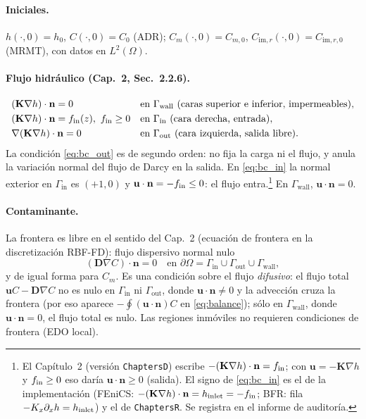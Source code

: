 \documentclass[11pt]{article}
\numberwithin{equation}{section}
\theoremstyle{remark}
\newcommand{\bu}{\mathbf{u}}
\newcommand{\bK}{\mathbf{K}}
\newcommand{\bD}{\mathbf{D}}
\newcommand{\bn}{\mathbf{n}}
\newcommand{\im}{\mathrm{im}}
\newcommand{\Gin}{\Gamma_{\mathrm{in}}}
\newcommand{\Gout}{\Gamma_{\mathrm{out}}}
\newcommand{\Gwall}{\Gamma_{\mathrm{wall}}}
\begin{document}
\paragraph{Iniciales.} $h(\cdot,0)=h_0$, $C(\cdot,0)=C_0$ (ADR); $C_m(\cdot,0)=C_{m,0}$, $C_{\im,r}(\cdot,0)=C_{\im,r,0}$ (MRMT), con datos en $L^2(\Omega)$.

\paragraph{Flujo hidr\'aulico (Cap.~2, Sec.~2.2.6).}
\begin{align}
&(\bK\nabla h)\cdot\bn=0 &&\text{en }\Gwall\ (\text{caras superior e inferior, impermeables}),\label{eq:bc_wall}\\
&(\bK\nabla h)\cdot\bn=f_{\rm in}(z),\ f_{\rm in}\ge0 &&\text{en }\Gin\ (\text{cara derecha, entrada}),\label{eq:bc_in}\\
&\nabla(\bK\nabla h)\cdot\bn=0 &&\text{en }\Gout\ (\text{cara izquierda, salida libre}).\label{eq:bc_out}
\end{align}
La condici\'on \eqref{eq:bc_out} es de segundo orden: no fija la carga ni el flujo, y anula la variaci\'on normal del flujo de Darcy en la salida.
En \eqref{eq:bc_in} la normal exterior en $\Gin$ es $(+1,0)$ y $\bu\cdot\bn=-f_{\rm in}\le0$: el flujo entra.\footnote{El
Cap\'itulo~2 (versi\'on \texttt{ChaptersD}) escribe $-(\bK\nabla h)\cdot\bn=f_{\rm in}$; con $\bu=-\bK\nabla h$ y $f_{\rm in}\ge0$ eso dar\'ia
$\bu\cdot\bn\ge0$ (salida). El signo de \eqref{eq:bc_in} es el de la implementaci\'on (FEniCS: $-(\bK\nabla h)\cdot\bn=h_{\rm inlet}=-f_{\rm in}$;
BFR: fila $-K_x\partial_xh=h_{\rm inlet}$) y el de \texttt{ChaptersR}. Se registra en el informe de auditor\'ia.}
En $\Gwall$, $\bu\cdot\bn=0$.

\paragraph{Contaminante.} La frontera es libre en el sentido del Cap.~2 (ecuaci\'on de frontera en la discretizaci\'on RBF-FD): flujo
dispersivo normal nulo
\begin{equation}
(\bD\nabla C)\cdot\bn=0\quad\text{en }\partial\Omega=\Gin\cup\Gout\cup\Gwall,
\label{eq:bc_C}
\end{equation}
y de igual forma para $C_m$. Es una condici\'on sobre el flujo \emph{difusivo}: el flujo total $\bu C-\bD\nabla C$ no es nulo en $\Gin$ ni $\Gout$,
donde $\bu\cdot\bn\ne0$ y la advecci\'on cruza la frontera (por eso aparece $-\oint(\bu\cdot\bn)C$ en \eqref{eq:balance}); s\'olo en $\Gwall$,
donde $\bu\cdot\bn=0$, el flujo total es nulo. Las regiones inm\'oviles no requieren condiciones de frontera (EDO local).
\end{document}
